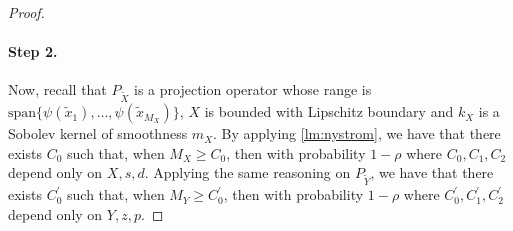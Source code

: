 \begin{proof}
\paragraph{Step 2.}
Now, recall that $P_{\tilde{X}}$ is a projection operator whose range is $\textrm{span}\{\psi(\tilde{x}_1),\dots, \psi(\tilde{x}_{M_X})\}$, $X$ is bounded with Lipschitz boundary and $k_X$ is a Sobolev kernel of smoothness $m_X$.
By applying \cref{lm:nystrom}, we have that there exists $C_0$ such that, when $M_X \geq C_0$, then with probability $1-\rho$
where $C_0, C_1, C_2$ depend only on $X, s, d$. Applying the same reasoning on $P_{\tilde{Y}}$, we have that there exists $C^\prime_0$ such that, when $M_Y \geq C^\prime_0$, then with probability $1-\rho$
where $C^\prime_0, C^\prime_1, C^\prime_2$ depend only on $Y, z, p$.


\end{proof}

